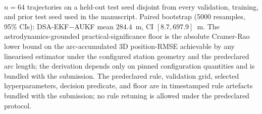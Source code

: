 \begin{table}[t]
{  }
  \\[2pt] {\footnotesize $n=64$ trajectories on a held-out test seed disjoint from every validation, training, and prior test seed used in the manuscript. Paired bootstrap (5000 resamples, 95\% CIs): DSA-EKF$-$AUKF mean $284.4$~m, CI $[8.7, 697.9]$~m. The astrodynamics-grounded \mbox{practical-significance} floor is the absolute Cramer-Rao lower bound on the arc-accumulated 3D position-RMSE achievable by any linearised estimator under the configured station geometry and the predeclared arc length; the derivation depends only on pinned configuration quantities and is bundled with the submission. The predeclared rule, validation grid, selected hyperparameters, decision predicate, and floor are in timestamped rule artefacts bundled with the submission; no rule retuning is allowed under the predeclared protocol.}
\end{table}